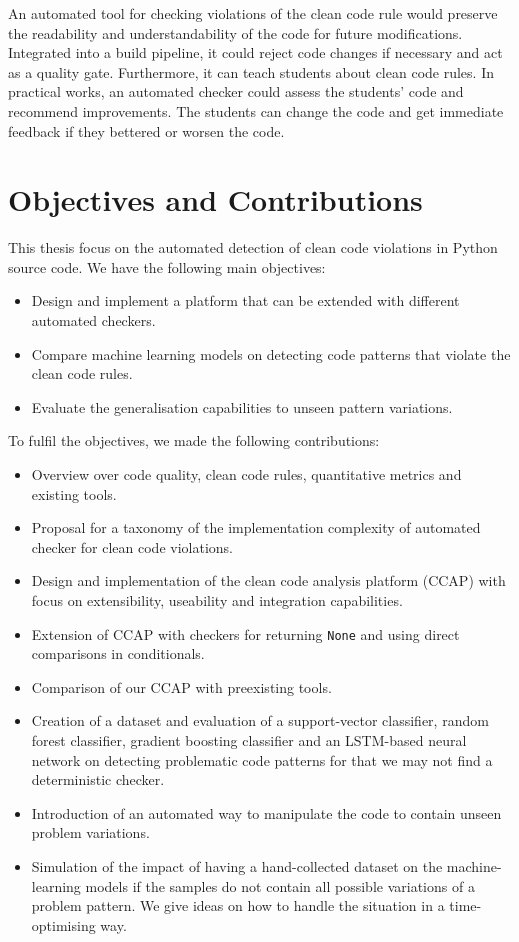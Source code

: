 An automated tool for checking violations of the clean code rule would preserve the readability and understandability of the code for future modifications. Integrated into a build pipeline, it could reject code changes if necessary and act as a quality gate.
Furthermore, it can teach students about clean code rules. In practical works, an automated checker could assess the students' code and recommend improvements. The students can change the code and get immediate feedback if they bettered or worsen the code.


\section{Objectives and Contributions}
This thesis focus on the automated detection of clean code violations in Python source code. 
We have the following main objectives:
\begin{itemize}
    \item Design and implement a platform that can be extended with different automated checkers.
    \item Compare machine learning models on detecting code patterns that violate the clean code rules.
    \item Evaluate the generalisation capabilities to unseen pattern variations.  
\end{itemize}

To fulfil the objectives, we made the following contributions:
\begin{itemize}
    \item Overview over code quality, clean code rules, quantitative metrics and existing tools.
    \item Proposal for a taxonomy of the implementation complexity of automated checker for clean code violations.
    \item Design and implementation of the clean code analysis platform (CCAP) with focus on extensibility, useability and integration capabilities.
    \item Extension of CCAP with checkers for returning \texttt{None} and using direct comparisons in conditionals.
    \item Comparison of our CCAP with preexisting tools.
    \item Creation of a dataset and evaluation of a support-vector classifier, random forest classifier, gradient boosting classifier and an LSTM-based neural network on detecting problematic code patterns for that we may not find a deterministic checker.
    \item Introduction of an automated way to manipulate the code to contain unseen problem variations.
    \item Simulation of the impact of having a hand-collected dataset on the machine-learning models if the samples do not contain all possible variations of a problem pattern. We give ideas on how to handle the situation in a time-optimising way.
\end{itemize}

